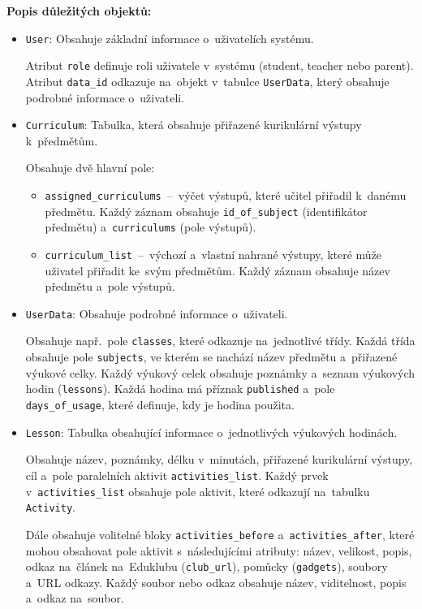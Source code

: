 \documentclass[male,czech,api_bc]{kitheses}
\begin{document}
\textbf{Popis důležitých objektů:}
\begin{itemize}
	\item \texttt{User}: Obsahuje základní informace o~uživatelích systému.
	
	Atribut \texttt{role} definuje roli uživatele v~systému (student, teacher nebo parent). Atribut \texttt{data\_id} odkazuje na~objekt v~tabulce \texttt{UserData}, který obsahuje podrobné informace o~uživateli.
	
	\item \texttt{Curriculum}: Tabulka, která obsahuje přiřazené kurikulární výstupy k~předmětům.
	
	Obsahuje dvě hlavní pole:
	\begin{itemize}
		\item \texttt{assigned\_curriculums}~--~výčet výstupů, které učitel přiřadil k~danému předmětu. Každý záznam obsahuje \texttt{id\_of\_subject} (identifikátor předmětu) a~\texttt{curriculums} (pole výstupů).
		\item \texttt{curriculum\_list}~--~výchozí a~vlastní nahrané výstupy, které může uživatel přiřadit ke~svým předmětům. Každý záznam obsahuje název předmětu a~pole výstupů.
	\end{itemize}
	
	\item \texttt{UserData}: Obsahuje podrobné informace o~uživateli.
	
	Obsahuje např.~pole \texttt{classes}, které odkazuje na~jednotlivé třídy. Každá třída obsahuje pole \texttt{subjects}, ve kterém se nachází název předmětu a~přiřazené výukové celky. Každý výukový celek obsahuje poznámky a~seznam výukových hodin (\texttt{lessons}). Každá hodina má příznak \texttt{published} a~pole \texttt{days\_of\_usage}, které definuje, kdy je hodina použita.
	
	\item \texttt{Lesson}: Tabulka obsahující informace o~jednotlivých výukových hodinách.
	
	Obsahuje název, poznámky, délku v~minutách, přiřazené kurikulární výstupy, cíl a~pole paralelních aktivit \texttt{activities\_list}. Každý prvek v~\texttt{activities\_list} obsahuje pole aktivit, které odkazují na~tabulku \texttt{Activity}.
	
	Dále obsahuje volitelné bloky \texttt{activities\_before} a~\texttt{activities\_after}, které mohou obsahovat pole aktivit s~následujícími atributy: název, velikost, popis, odkaz na~článek na~Eduklubu (\texttt{club\_url}), pomůcky (\texttt{gadgets}), soubory a~URL odkazy. Každý soubor nebo odkaz obsahuje název, viditelnost, popis a~odkaz na~soubor.
\end{itemize}
\end{document}
